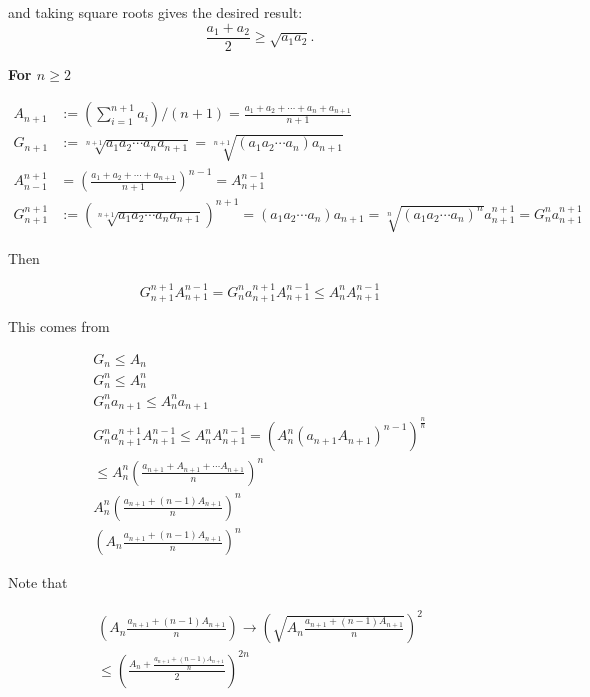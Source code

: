 and taking square roots gives the desired result:
\[
	\frac{a_1 + a_2}{2} \geq \sqrt{a_1 a_2}.
\]

\textbf{For \( n \geq 2 \)}

\begin{align*}
	A_{n + 1} &:= (\sum_{i=1}^{n + 1} a_i) / (n + 1) = \frac{a_1 + a_2 + \cdots + a_n + a_{n + 1}}{n + 1}\\
	G_{n + 1} &:= \sqrt[n + 1]{a_1 a_2 \cdots a_n a_{n + 1}} = \sqrt[n + 1]{(a_1 a_2 \cdots a_n) a_{n + 1}}\\
	A_{n - 1}^{n + 1}&= {(\frac{a_1 + a_2 + \cdots + a_{n + 1}}{n + 1})}^{n - 1} = A_{n + 1}^{n - 1}\\
	G_{n + 1}^{n + 1} &:= {(\sqrt[n + 1]{a_1 a_2 \cdots a_n a_{n + 1}})}^{n + 1} = (a_1 a_2 \cdots a_n) a_{n + 1} = \sqrt[n]{{(a_1 a_2 \cdots a_n)}^{n}} a_{n + 1}^{n + 1} = G_{n}^{n} a_{n + 1}^{n + 1}
\end{align*}

Then

\[G_{n + 1}^{n + 1}  A_{n + 1}^{n - 1} = G_{n}^{n} a_{n + 1}^{n + 1} A_{n + 1}^{n - 1} \leq A_{n}^{n} A_{n + 1}^{n - 1}\]

This comes from

\begin{align*}
		G_n \leq A_n\\
		G_n^{n} \leq A_n^{n}\\
		G_n^{n} a_{n+1} \leq A_n^{n} a_{n+1}\\
		G_{n}^{n} a_{n + 1}^{n + 1} A_{n + 1}^{n - 1} \leq A_{n}^{n} A_{n + 1}^{n - 1} = {\left(A_{n}^{n} {\left( a_{n + 1} A_{n +1}\right)}^{n -1} \right)}^{\frac{n}{n}}\\
		\leq A_{n}^{n} {\left( \frac{a_{n + 1} + A_{n + 1} + \cdots A_{n + 1}}{n} \right)}^{n}\\
		A_{n}^{n} {\left( \frac{a_{n + 1} + (n - 1)A_{n + 1}}{n} \right)}^{n}\\
		{\left( A_{n} \frac{a_{n + 1} + (n - 1)A_{n + 1}}{n} \right)}^{n}
\end{align*}

Note that

\begin{align*}
	\left( A_{n} \frac{a_{n + 1} + (n - 1)A_{n + 1}}{n} \right) \rightarrow  {\left( \sqrt{A_{n} \frac{a_{n + 1} + (n - 1)A_{n + 1}}{n}} \right)}^{2}\\
	\leq {\left( \frac{ A_n + \frac{a_{n + 1} + (n - 1)A_{n + 1}}{n}}{2} \right)}^{2n}
\end{align*}

